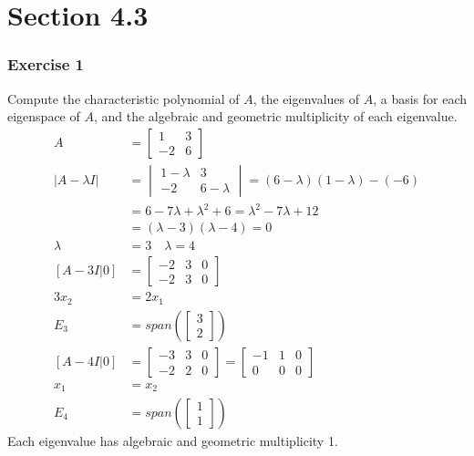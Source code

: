 \documentclass{math}
\begin{document}
\section*{Section 4.3}

\subsubsection*{Exercise 1}
Compute the characteristic polynomial of \( A \), the eigenvalues of \( A \),
a basis for each eigenspace of \( A \), and the algebraic and geometric
multiplicity of each eigenvalue.
\begin{align*}
  A &= \begin{bmatrix}1 & 3 \\ -2 & 6\end{bmatrix} \\
  |A-\lambda I| &= \begin{vmatrix}
    1-\lambda & 3 \\
    -2 & 6-\lambda
  \end{vmatrix} = (6-\lambda)(1-\lambda)-(-6) \\
  &= 6-7\lambda+\lambda^2+6 = \lambda^2-7\lambda+12 \\
  &= (\lambda-3)(\lambda-4) = 0 \\
  \lambda &= 3 \quad \lambda = 4 \\
  [A-3I|0] &= \begin{bmatrix}
    -2 & 3 & 0 \\
    -2 & 3 & 0
  \end{bmatrix} \\
  3x_2 &= 2x_1 \\
  E_3 &= span\left(\begin{bmatrix}3 \\ 2\end{bmatrix}\right) \\
  [A-4I|0] &= \left[\begin{array}{cc|c}
    -3 & 3 & 0 \\
    -2 & 2 & 0
  \end{array}\right] = \begin{bmatrix}
    -1 & 1 & 0 \\
    0 & 0 & 0
  \end{bmatrix} \\
  x_1 &= x_2 \\
  E_4 &= span\left(\begin{bmatrix}1 \\ 1\end{bmatrix}\right)
\end{align*}
Each eigenvalue has algebraic and geometric multiplicity 1.
\end{document}
